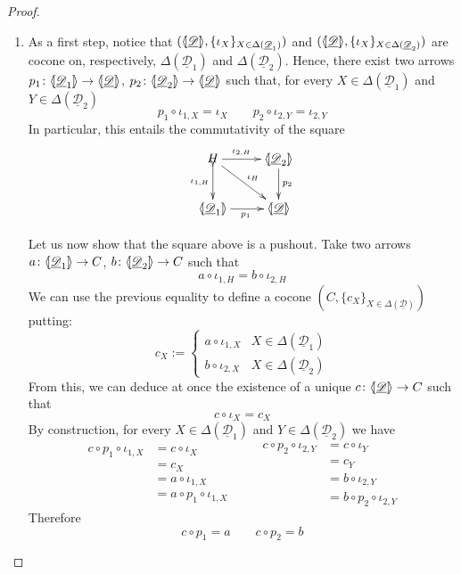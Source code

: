 \documentclass[a4paper,UKenglish,cleveref,pdftex, thm-restate,numberwithinsect]{lipics}
\newcommand{\dder}[1]{\mathscr{#1}}
\newcommand{\der}[1]{\underline{\dder{#1}}}
\newcommand{\lpro}{\langle \hspace{-1.85pt}[}
\newcommand{\rpro}{]\hspace{-1.85pt}\rangle}
\newcommand{\tpro}[1]{\lpro \der{#1}\rpro}
\newcommand{\tproi}[2]{\lpro \der{#1}_{#2}\rpro}
\begin{document}
\begin{proof}
\begin{enumerate}
		\item  As a first step, notice that $(\tpro{D}, \{\iota_X\}_{X\in \Delta(\der{D}_1)})$ and $(\tpro{D}, \{\iota_X\}_{X\in \Delta(\der{D}_2)})$ are cocone on, respectively, $\Delta(\der{D}_1)$ and $\Delta(\der{D}_2)$. Hence, there exist two arrows $p_1\colon \tproi{D}{1}\to \tpro{D}$, $p_2\colon \tproi{D}{2}\to \tpro{D}$ such that, for every $X\in  \Delta(\der{D}_1)$ and $Y\in  \Delta(\der{D}_2)$
		\[p_1\circ \iota_{1, X} = \iota_X \qquad p_2\circ \iota_{2, Y}=\iota_{2,Y}\]
		In particular, this entails the commutativity of the square
				\[\xymatrix{H \ar[dr]^{\iota_H} \ar[r]^-{\iota_{2, H}} \ar@{>->}[d]_-{\iota_{1, H}} & \tproi{D}{2} \ar[d]^{p_2}\\  \tproi{D}{1} \ar[r]_{p_1}& \tpro{D}}\]
		
	Let us now show that the square above is a pushout. Take two arrows $a\colon \tproi{D}{1}\to C$, $b\colon \tproi{D}{2}\to C$ such that
	\[a\circ \iota_{1, H}=b\circ \iota_{2, H}\]
	We can use the previous equality to define a cocone $(C, \{c_X\}_{X\in \Delta(\der{D})})$ putting:
	\[c_X:=\begin{cases}
		a\circ \iota_{1, X} & X\in \Delta(\der{D}_1)\\
		b\circ \iota_{2, X} & X\in \Delta(\der{D}_2)
	\end{cases}\]
From this, we can deduce at once the existence of a unique $c\colon \tpro{D}\to C$ such that 
\[c\circ \iota_X = c_X\]
By construction, for every $X\in  \Delta(\der{D}_1)$ and $Y\in  \Delta(\der{D}_2)$ we have
\[\begin{split}
	c\circ p_1 \circ \iota_{1,X}&=c\circ \iota_{X}\\&=c_X \\&=a\circ \iota_{1,X}\\&=a\circ p_1\circ \iota_{1,X}
\end{split}\qquad \begin{split}
	c\circ p_2 \circ \iota_{2,Y}&=c\circ \iota_{Y}\\&=c_Y \\&=b\circ \iota_{2,Y}\\&=b\circ p_2\circ \iota_{2,Y}
\end{split}\]
Therefore
\[c\circ p_1=a \qquad c\circ p_2 = b\]


\end{enumerate}
\end{proof}
\end{document}

